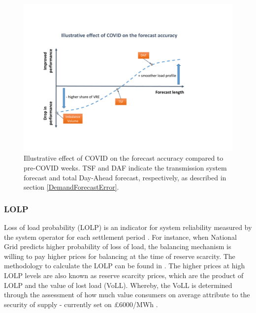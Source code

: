 \documentclass[energies,article,submit,moreauthors,pdftex]{Definitions/mdpi}
\begin{document}
\begin{figure}[H]
\centering
\hspace{-25pt}\includegraphics[trim={-1cm 3cm 3cm 3cm},clip,width=1\textwidth]{Graphics/Illustrative-forecast-summary.pdf}
\caption{Illustrative effect of COVID on the forecast accuracy compared to pre-COVID weeks. TSF and DAF indicate the transmission system forecast and total Day-Ahead forecast, respectively, as described in section \ref{DemandForecastError}.}\label{fig:Illustrative-forecast-summary}
\end{figure} 

\subsubsection{LOLP}\label{section:LOLP_DRM}

Loss of load probability (LOLP) is an indicator for system reliability measured by the system operator for each settlement period \cite{ELEXON2019GuidanceBritain}. For instance, when National Grid predicts higher probability of loss of load, the balancing mechanism is willing to pay higher prices for balancing at the time of reserve scarcity. The methodology to calculate the LOLP can be found in \cite{Elexon2019LossStatement}. The higher prices at high LOLP levels are also known as reserve scarcity prices, which are the product of LOLP and the value of lost load (VoLL). Whereby, the VoLL is determined through the assessment of how much value consumers on average attribute to the security of supply - currently set on £6000/MWh \cite{ELEXON2019GuidanceBritain}. 
\end{document}
